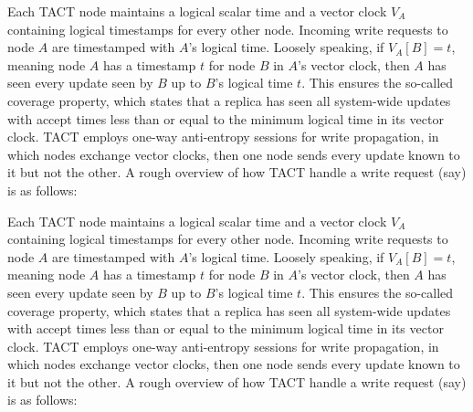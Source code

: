 Each TACT node maintains a logical scalar time and a vector clock $V_A$ containing logical timestamps for every other node. Incoming write requests to node $A$ are timestamped with $A$'s logical time. Loosely speaking, if $V_A[B]=t$, meaning node $A$ has a timestamp $t$ for node $B$ in $A$'s vector clock, then $A$ has seen every update seen by $B$ up to $B$'s logical time $t$. This ensures the so-called coverage property, which states that a replica has seen all system-wide updates with accept times less than or equal to the minimum logical time in its vector clock. TACT employs one-way anti-entropy sessions for write propagation, in which nodes exchange vector clocks, then one node sends every update known to it but not the other. A rough overview of how TACT handle a write request (say) is as follows:

Each TACT node maintains a logical scalar time and a vector clock $V_A$ containing logical timestamps for every other node. Incoming write requests to node $A$ are timestamped with $A$'s logical time. Loosely speaking, if $V_A[B]=t$, meaning node $A$ has a timestamp $t$ for node $B$ in $A$'s vector clock, then $A$ has seen every update seen by $B$ up to $B$'s logical time $t$. This ensures the so-called coverage property, which states that a replica has seen all system-wide updates with accept times less than or equal to the minimum logical time in its vector clock. TACT employs one-way anti-entropy sessions for write propagation, in which nodes exchange vector clocks, then one node sends every update known to it but not the other. A rough overview of how TACT handle a write request (say) is as follows:
